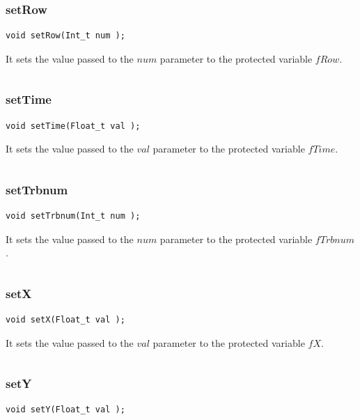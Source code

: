 \documentclass[a4paper]{book}
\begin{document}
\subsubsection{setRow}

\begin{lstlisting}
void setRow(Int_t num );
\end{lstlisting}

It sets the value passed to the $num$ parameter to the protected variable $fRow$.

\[\]

\subsubsection{setTime}

\begin{lstlisting}
void setTime(Float_t val );
\end{lstlisting}

It sets the value passed to the $val$ parameter to the protected variable $fTime$.

\[\]

\subsubsection{setTrbnum}

\begin{lstlisting}
void setTrbnum(Int_t num );
\end{lstlisting}

It sets the value passed to the $num$ parameter to the protected variable $fTrbnum$.

\[\]

\subsubsection{setX}

\begin{lstlisting}
void setX(Float_t val );
\end{lstlisting}

It sets the value passed to the $val$ parameter to the protected variable $fX$.

\[\]

\subsubsection{setY}

\begin{lstlisting}
void setY(Float_t val );
\end{lstlisting}
\end{document}
